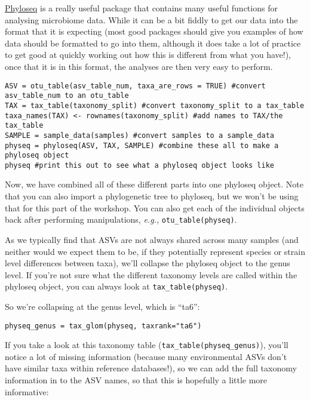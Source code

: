 \documentclass[
]{book}
\begin{document}
\href{https://joey711.github.io/phyloseq/}{Phyloseq} is a really useful package that contains many useful functions for analysing microbiome data. While it can be a bit fiddly to get our data into the format that it is expecting (most good packages should give you examples of how data should be formatted to go into them, although it does take a lot of practice to get good at quickly working out how this is different from what you have!), once that it is in this format, the analyses are then very easy to perform.

\begin{verbatim}
ASV = otu_table(asv_table_num, taxa_are_rows = TRUE) #convert asv_table_num to an otu_table
TAX = tax_table(taxonomy_split) #convert taxonomy_split to a tax_table
taxa_names(TAX) <- rownames(taxonomy_split) #add names to TAX/the tax_table
SAMPLE = sample_data(samples) #convert samples to a sample_data
physeq = phyloseq(ASV, TAX, SAMPLE) #combine these all to make a phyloseq object
physeq #print this out to see what a phyloseq object looks like
\end{verbatim}

Now, we have combined all of these different parts into one phyloseq object. Note that you can also import a phylogenetic tree to phyloseq, but we won't be using that for this part of the workshop. You can also get each of the individual objects back after performing manipulations, \emph{e.g.,} \texttt{otu\_table(physeq)}.

As we typically find that ASVs are not always shared across many samples (and neither would we expect them to be, if they potentially represent species or strain level differences between taxa), we'll collapse the phyloseq object to the genus level. If you're not sure what the different taxonomy levels are called within the phyloseq object, you can always look at \texttt{tax\_table(physeq)}.

So we're collapsing at the genus level, which is ``ta6'':

\begin{verbatim}
physeq_genus = tax_glom(physeq, taxrank="ta6")
\end{verbatim}

If you take a look at this taxonomy table (\texttt{tax\_table(physeq\_genus)}), you'll notice a lot of missing information (because many environmental ASVs don't have similar taxa within reference databases!), so we can add the full taxonomy information in to the ASV names, so that this is hopefully a little more informative:
\end{document}

